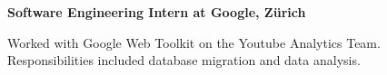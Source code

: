 \documentclass[10pt]{article} %
\begin{document}
\begin{minipage}[t]{0.5\textwidth}
{\raggedright\large \textbf{Software Engineering Intern at Google, Z\"urich}\\
}

\normalsize{Worked with Google Web Toolkit on the Youtube Analytics Team. Responsibilities included database migration and data analysis.}\\











	

\end{minipage} %
\hfill
\end{document}
